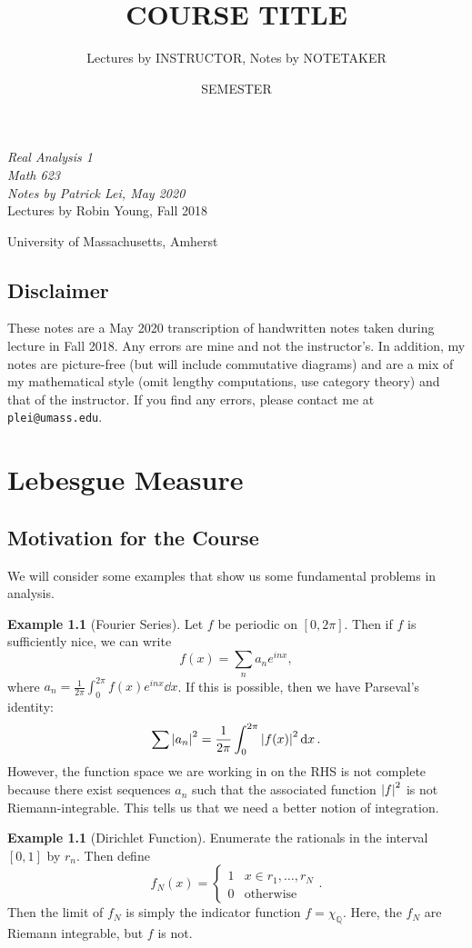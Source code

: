\documentclass[leqno, openany]{memoir}
\title{COURSE TITLE}
\author{Lectures by INSTRUCTOR, Notes by NOTETAKER}
\date{SEMESTER}
\theoremstyle{definition}
\newtheorem{exm}[thm]{Example}
\theoremstyle{remark}
\theoremstyle{plain}
\theoremstyle{definition}
\theoremstyle{remark}
\newcommand{\Q}{\mathbb{Q}}
\newcommand*{\titleSW}
    {\begingroup%
    \raggedleft
    \vspace*{\baselineskip}
    {\Huge\itshape Real Analysis 1 \\ Math 623}\\[\baselineskip]
    {\large\itshape Notes by Patrick Lei,
                    May 2020}\\[0.2\textheight]
    {\Large Lectures by Robin Young, Fall 2018}\par
    \vfill
    {\Large \sffamily University of Massachusetts, Amherst}
    \vspace*{\baselineskip}
\endgroup}
\begin{document}
    
\begin{titlingpage}
\titleSW
\end{titlingpage}

\thispagestyle{empty}
\section*{Disclaimer}%
\label{sec:disclaimer}

These notes are a May 2020 transcription of handwritten notes taken during lecture in Fall 2018. 
Any errors are mine and not the instructor's. 
In addition, my notes are picture-free (but will include commutative diagrams) and are a mix of my mathematical style 
(omit lengthy computations, use category theory) and that of the instructor.
If you find any errors, please contact me at \texttt{plei@umass.edu}.
\newpage



\tableofcontents

\chapter{Lebesgue Measure}%
\label{cha:lebesgue_measure}

\section{Motivation for the Course}%
\label{sec:introduction}

We will consider some examples that show us some fundamental problems in analysis.

\begin{exm}[Fourier Series]
    Let $f$ be periodic on $[0, 2\pi]$. Then if $f$ is sufficiently nice, we can write
    \[ f(x) = \sum_{n} a_n e^{inx}, \]
    where $a_n = \frac{1}{2\pi} \int_0^{2\pi} f(x) e^{inx} \dd{x}$. If this is possible, then we have Parseval's identity:
    \[ \sum \abs{a_n}^2 = \frac{1}{2\pi} \int_0^{2\pi} \abs{f(x)}^2 \dd{x}. \]
    However, the function space we are working in on the RHS is not complete because there exist sequences $a_n$ such that the associated function $\abs{f}^2$ is not Riemann-integrable. This tells us that we need a better notion of integration.
\end{exm}

\begin{exm}[Dirichlet Function]
    Enumerate the rationals in the interval $[0,1]$ by $r_n$. Then define 
    \[ f_N(x) = \begin{cases}
        1 & x \in {r_1, \ldots, r_N} \\
        0 & \text{otherwise}
    \end{cases}. \]
    Then the limit of $f_N$ is simply the indicator function $f = \chi_{\Q}$. Here, the $f_N$ are Riemann integrable, but $f$ is not.
\end{exm}
\end{document}
